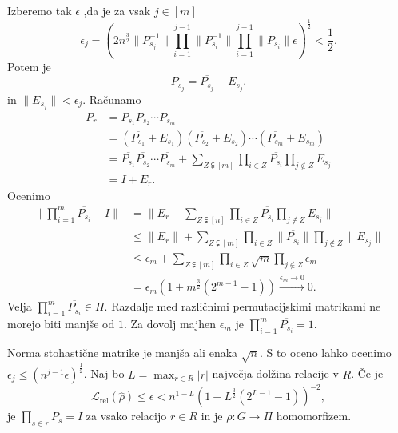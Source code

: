 \documentclass[mat2, tisk]{fmfdelo}
\newcommand{\Loss}[1]{\mathcal L _\text{#1}}
\begin{document}
\begin{dokaz}
  Izberemo tak $\epsilon$
  ,da je za vsak $j \in [m]$
  $$\epsilon_j
  =
  \left(
    2 n^{\frac{3}{2}}
    \|P_{s_j}^{-1}\|
    \prod_{i=1}^{j-1}
    \|P_{s_i}^{-1}\|
    \prod_{i=1}^{j-1}
    \|P_{s_i}\|
    \epsilon
  \right)^{\frac{1}{2}}
  < \frac{1}{2}.$$
  Potem je
  $$
  P_{s_j} = \overline{P_{s_j}} + E_{s_j}.
  $$
  in $\|E_{s_j}\| < \epsilon_j$.
  Računamo
  \begin{align*}
    P_r &= P_{s_1} P_{s_2} \dotsm P_{s_m}
    \\
    &=
    (\overline{P_{s_1}} + E_{s_1})
    (\overline{P_{s_2}} + E_{s_2}) \dotsm
    (\overline{P_{s_m}} + E_{s_m})
    \\
    &=
    \overline{P_{s_1}} \overline{P_{s_2}} \dotsm
    \overline{P_{s_m}} +
    \sum_{Z \subsetneqq [m]} \prod_{i \in Z} \overline{P_{s_i}}
    \prod_{j \notin Z} E_{s_j}
    \\
    &= I + E_r.
  \end{align*}
  Ocenimo
  \begin{align*}
    \|\prod_{i=1}^m \overline{P_{s_i}} - I \|
    &= \|E_r - \sum_{Z \subsetneqq [n]} \prod_{i \in Z}
    \overline{P_{s_i}}
    \prod_{j \notin Z} E_{s_j} \| \\
    &\leq
    \|E_r\| +
    \sum_{Z \subsetneqq [m]} \prod_{i \in Z}
    \|\overline{P_{s_i}}\| \prod_{j \notin Z} \|E_{s_j} \| \\
    &\leq \epsilon_m  +
    \sum_{Z \subsetneqq [m]} \prod_{i \in Z}
    \sqrt{m} \prod_{j \notin Z} \epsilon_m
    \\
    &=
    \epsilon_m(1 + m^\frac{3}{2}(2^{m-1}-1))
    \xrightarrow{\epsilon_m \to 0} 0.
  \end{align*}
  Velja  $\prod_{i=1}^m \overline{P_{s_i}} \in \Pi$.
  Razdalje med različnimi permutacijskimi matrikami
  ne morejo biti manjše od $1$.
  Za dovolj majhen $\epsilon_m$ je
  $\prod_{i=1}^m \overline{P_{s_i}} = 1$.

  Norma stohastične matrike je
  manjša ali enaka $\sqrt{n}$. S to oceno lahko ocenimo
  $
  \epsilon_j
  \leq
  \left(
    n^{j-1} \epsilon
  \right)^{\frac{1}{2}}
  $.  Naj bo $L = \max_{r \in R} |r|$ največja
  dolžina relacije v $R$.
  Če je
  $$
  \Loss{rel}(\hat \rho) \leq \epsilon < n^{1-L}(1 +
  L^\frac{3}{2}(2^{L-1}-1))^{-2},
  $$
  je $ \prod_{s \in r} \overline{P_s} = I$
  za vsako relacijo $r \in R$ in je
  $\rho \colon G \to \Pi$ homomorfizem.
\end{dokaz}
%
%
\end{document}

